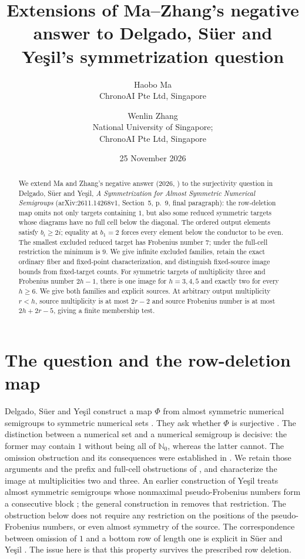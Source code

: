 \documentclass[11pt,a4paper]{article}
\title{Extensions of Ma--Zhang's negative answer to Delgado, S\"uer and Ye\c{s}il's symmetrization question}
\author{Haobo Ma\\\small ChronoAI Pte Ltd, Singapore
\and Wenlin Zhang\\\small National University of Singapore;\\\small ChronoAI Pte Ltd, Singapore}
\date{25 November 2026}
\theoremstyle{definition}
\theoremstyle{remark}
\newcommand{\N}{\mathbb{N}_0}
\begin{document}
\maketitle
\begin{abstract}
We extend Ma and Zhang's negative answer (2026, \cite[Section~2]{MZ}) to
the surjectivity question in Delgado, S\"uer and Ye\c{s}il,
\emph{A Symmetrization for Almost Symmetric Numerical Semigroups}
(arXiv:2611.14268v1, Section~5, p.~9, final paragraph):
the row-deletion map omits not only targets containing $1$, but also
some reduced symmetric targets whose diagrams have no full cell below
the diagonal.
The ordered output elements satisfy $b_i\geq2i$; equality at $b_1=2$
forces every element below the conductor to be even.
The smallest excluded reduced target has Frobenius number $7$;
under the full-cell restriction the minimum is $9$.
We give infinite excluded families, retain the exact ordinary fiber and
fixed-point characterization, and distinguish fixed-source image bounds
from fixed-target counts.
For symmetric targets of multiplicity three and Frobenius number $2h-1$,
there is one image for $h=3,4,5$ and exactly two for every $h\geq6$.
We give both families and explicit sources. At arbitrary output
multiplicity $r<h$, source multiplicity is at most $2r-2$ and source
Frobenius number is at most $2h+2r-5$, giving a finite membership test.
\end{abstract}

\section{The question and the row-deletion map}
Delgado, S\"uer and Ye\c{s}il construct a map $\Phi$ from almost symmetric
numerical semigroups to symmetric numerical sets \cite[Theorem~4.2]{DSY}.
They ask whether $\Phi$ is surjective \cite[Section~5, p.~9, final paragraph]{DSY}.
The distinction between a numerical set and a numerical semigroup is decisive:
the former may contain $1$ without being all of $\N$, whereas the latter cannot.
The omission obstruction and its consequences were established in \cite[Section~2]{MZ}. We retain those arguments and the prefix and full-cell obstructions of \cite[Sections~3--6]{MZ4}, and characterize the image at multiplicities two and three.
An earlier construction of Ye\c{s}il treats almost symmetric semigroups whose
nonmaximal pseudo-Frobenius numbers form a consecutive block
\cite[Lemma~5.7]{Y}; the general construction in \cite[Theorem~4.2]{DSY}
removes that restriction. The obstruction below does not require any
restriction on the positions of the pseudo-Frobenius numbers, or even
almost symmetry of the source.
The correspondence between omission of $1$ and a bottom row of length one
is explicit in S\"uer and Ye\c{s}il \cite[Proposition~3.5 and Corollary~3.6]{SY}.
The issue here is that this property survives the prescribed row deletion.
\end{document}
